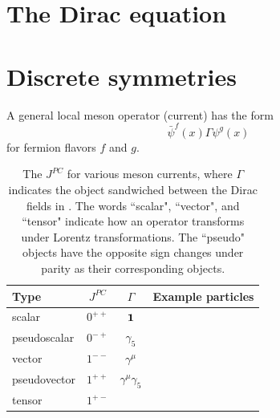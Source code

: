 

\section{The Dirac equation}


\section{Discrete symmetries}\label{sec:discreteSymm}

A general local meson operator (current) has the form
\begin{equation}\label{eq:mesonInterp}
  \bar{\psi}^f(x)\Gamma\psi^g(x)
\end{equation}
for fermion flavors $f$ and $g$.


\begin{table}
\begin{tabularx}{\linewidth}{LCCr} \hline\hline
Type         & $J^{PC}$ & $\Gamma$ & Example particles \\\hline
scalar       & $0^{++}$ & ${\mathbf 1}$                 &  \\
pseudoscalar & $0^{-+}$ & $\gamma_5$            &  \\ 
vector       & $1^{--}$ & $\gamma^\mu$          &  \\ 
pseudovector & $1^{++}$ & $\gamma^\mu\gamma_5$  &  \\ 
tensor       & $1^{+-}$ &          &  \\ 
\hline\hline
\end{tabularx}
\caption{The $J^{PC}$ for various meson currents, where $\Gamma$ indicates the
object sandwiched between the Dirac fields in .
The words ``scalar", ``vector", and ``tensor" indicate how an operator
transforms under Lorentz transformations. The ``pseudo" objects have the
opposite sign changes under parity as their corresponding objects.}
\label{tab:discreteSymm}
\end{table}


